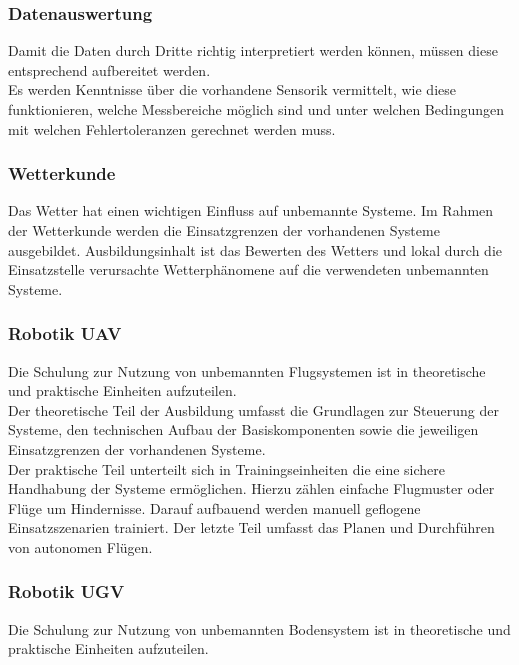 \subsubsection{Datenauswertung}

Damit die Daten durch Dritte richtig interpretiert werden können, müssen diese entsprechend aufbereitet werden.\\

\noindent Es werden Kenntnisse über die vorhandene Sensorik vermittelt, wie diese funktionieren, welche Messbereiche möglich sind und unter welchen Bedingungen mit welchen Fehlertoleranzen gerechnet werden muss.

\subsubsection{Wetterkunde}

Das Wetter hat einen wichtigen Einfluss auf unbemannte Systeme. Im Rahmen der Wetterkunde werden die Einsatzgrenzen der vorhandenen Systeme ausgebildet. Ausbildungsinhalt ist das Bewerten des Wetters und lokal durch die Einsatzstelle verursachte Wetterphänomene auf die verwendeten unbemannten Systeme.

\subsubsection{Robotik UAV}

Die Schulung zur Nutzung von unbemannten Flugsystemen ist in theoretische und praktische Einheiten aufzuteilen.\\

\noindent Der theoretische Teil der Ausbildung umfasst die Grundlagen zur Steuerung der Systeme, den technischen Aufbau der Basiskomponenten sowie die jeweiligen Einsatzgrenzen der vorhandenen Systeme.\\

\noindent Der praktische Teil unterteilt sich in Trainingseinheiten die eine sichere Handhabung der Systeme ermöglichen. Hierzu zählen einfache Flugmuster oder Flüge um Hindernisse. Darauf aufbauend werden manuell geflogene Einsatzszenarien trainiert. Der letzte Teil umfasst das Planen und Durchführen von autonomen Flügen.

\subsubsection{Robotik UGV}

Die Schulung zur Nutzung von unbemannten Bodensystem ist in theoretische und praktische Einheiten aufzuteilen.\\

